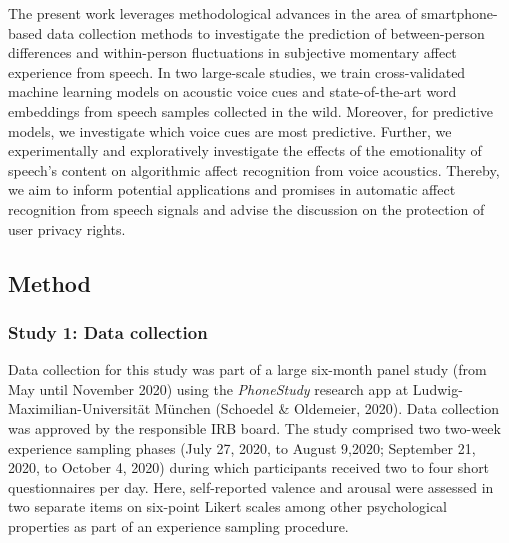 \documentclass[
  man,floatsintext]{apa6}
\begin{document}
The present work leverages methodological advances in the area of smartphone-based data collection methods to investigate the prediction of between-person differences and within-person fluctuations in subjective momentary affect experience from speech. In two large-scale studies, we train cross-validated machine learning models on acoustic voice cues and state-of-the-art word embeddings from speech samples collected in the wild. Moreover, for predictive models, we investigate which voice cues are most predictive. Further, we experimentally and exploratively investigate the effects of the emotionality of speech's content on algorithmic affect recognition from voice acoustics. Thereby, we aim to inform potential applications and promises in automatic affect recognition from speech signals and advise the discussion on the protection of user privacy rights.

\hypertarget{method}{%
\subsection{Method}\label{method}}

\hypertarget{study-1-data-collection}{%
\subsubsection{Study 1: Data collection}\label{study-1-data-collection}}

Data collection for this study was part of a large six-month panel study (from May until November 2020) using the \emph{PhoneStudy} research app at Ludwig-Maximilian-Universität München (Schoedel \& Oldemeier, 2020). Data collection was approved by the responsible IRB board. The study comprised two two-week experience sampling phases (July 27, 2020, to August 9,2020; September 21, 2020, to October 4, 2020) during which participants received two to four short questionnaires per day. Here, self-reported valence and arousal were assessed in two separate items on six-point Likert scales among other psychological properties as part of an experience sampling procedure.
\end{document}
